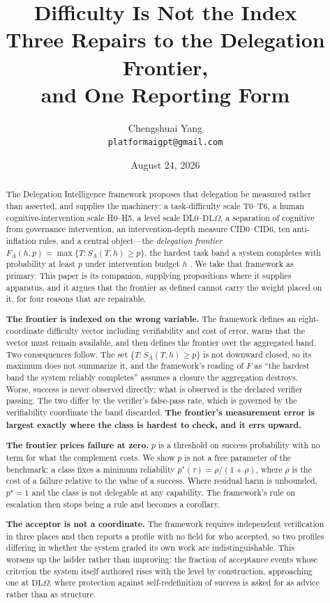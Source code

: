 \documentclass[11pt]{article}
\title{\LARGE Difficulty Is Not the Index\\[6pt]
\large Three Repairs to the Delegation Frontier,\\
and One Reporting Form}
\author{Chengshuai Yang\\
\small\texttt{platformaigpt@gmail.com}}
\date{August 24, 2026}
\theoremstyle{definition}
\newcommand{\pstar}{\ensuremath{p^{\star}}}
\newcommand{\DLO}{\ensuremath{\mathrm{DL}\Omega}}
\begin{document}
\maketitle

\begin{abstract}
The Delegation Intelligence framework proposes that delegation be measured rather than asserted, and supplies the machinery: a task-difficulty scale T0--T6, a human cognitive-intervention scale H0--H5, a level scale DL0--\DLO{}, a separation of cognitive from governance intervention, an intervention-depth measure CID0--CID6, ten anti-inflation rules, and a central object---the \emph{delegation frontier} $F_A(h,p)=\max\{T: S_A(T,h)\ge p\}$, the hardest task band a system completes with probability at least $p$ under intervention budget $h$ \citep{yang2026delegation}. We take that framework as primary. This paper is its companion, supplying propositions where it supplies apparatus, and it argues that the frontier as defined cannot carry the weight placed on it, for four reasons that are repairable.

\textbf{The frontier is indexed on the wrong variable.} The framework defines an eight-coordinate difficulty vector including verifiability and cost of error, warns that the vector must remain available, and then defines the frontier over the aggregated band. Two consequences follow. The set $\{T : S_A(T,h)\ge p\}$ is not downward closed, so its maximum does not summarize it, and the framework's reading of $F$ as ``the hardest band the system reliably completes'' assumes a closure the aggregation destroys. Worse, success is never observed directly; what is observed is the declared verifier passing. The two differ by the verifier's false-pass rate, which is governed by the verifiability coordinate the band discarded. \textbf{The frontier's measurement error is largest exactly where the class is hardest to check, and it errs upward.}

\textbf{The frontier prices failure at zero.} $p$ is a threshold on success probability with no term for what the complement costs. We show $p$ is not a free parameter of the benchmark: a class fixes a minimum reliability $\pstar(\tau)=\rho/(1+\rho)$, where $\rho$ is the cost of a failure relative to the value of a success. Where residual harm is unbounded, $\pstar=1$ and the class is not delegable at any capability. The framework's rule on escalation then stops being a rule and becomes a corollary.

\textbf{The acceptor is not a coordinate.} The framework requires independent verification in three places and then reports a profile with no field for who accepted, so two profiles differing in whether the system graded its own work are indistinguishable. This worsens up the ladder rather than improving: the fraction of acceptance events whose criterion the system itself authored rises with the level by construction, approaching one at \DLO{}, where protection against self-redefinition of success is asked for as advice rather than as structure.


\end{abstract}
\end{document}
